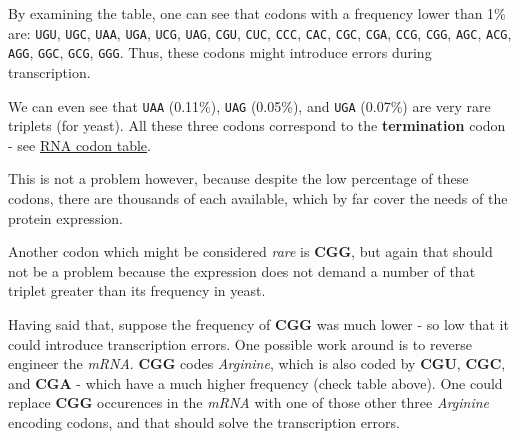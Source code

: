 
By examining the table, one can see that codons with a frequency lower than 1\% are: \texttt{UGU}, \texttt{UGC}, \texttt{UAA}, \texttt{UGA}, \texttt{UCG}, \texttt{UAG}, \texttt{CGU}, \texttt{CUC}, \texttt{CCC}, \texttt{CAC}, \texttt{CGC}, \texttt{CGA}, \texttt{CCG}, \texttt{CGG}, \texttt{AGC}, \texttt{ACG}, \texttt{AGG}, \texttt{GGC}, \texttt{GCG}, \texttt{GGG}. Thus, these codons might introduce errors during transcription.

We can even see that \texttt{UAA} (0.11\%), \texttt{UAG} (0.05\%), and \texttt{UGA} (0.07\%) are very rare triplets (for yeast). All these three codons correspond to the \textbf{termination} codon - see \href{https://en.wikipedia.org/wiki/Genetic_code#RNA_codon_table}{RNA codon table}.

This is not a problem however, because despite the low percentage of these codons, there are thousands of each available, which by far cover the needs of the protein expression.

Another codon which might be considered \textit{rare} is \textbf{CGG}, but again that should not be a problem because the expression does not demand a number of that triplet greater than its frequency in yeast.

Having said that, suppose the frequency of \textbf{CGG} was much lower - so low that it could introduce transcription errors. One possible work around is to reverse engineer the \textit{mRNA}. \textbf{CGG} codes \textit{Arginine}, which is also coded by \textbf{CGU}, \textbf{CGC}, and \textbf{CGA} - which have a much higher frequency (check table above). One could replace \textbf{CGG} occurences in the \textit{mRNA} with one of those other three \textit{Arginine} encoding codons, and that should solve the transcription errors.

\newpage
